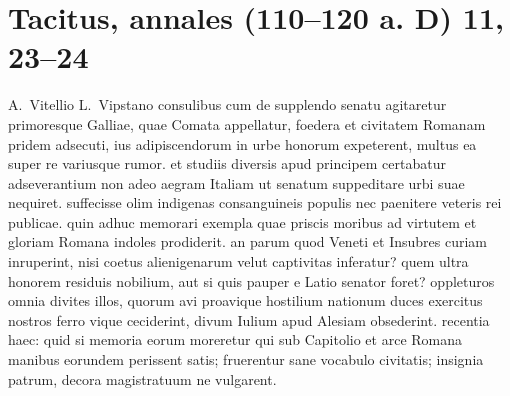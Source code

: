 
\section*{Tacitus, annales (110–120 a. D) 11, 23–24}
\label{sec:annales}

A.~Vitellio L.~Vipstano consulibus cum de supplendo senatu agitaretur primoresque Galliae, quae Comata appellatur, foedera et civitatem Romanam pridem adsecuti, ius adipiscendorum in urbe honorum expeterent, multus ea super re variusque rumor. et studiis diversis apud principem certabatur adseverantium non adeo aegram Italiam ut senatum suppeditare urbi suae nequiret. suffecisse olim indigenas consanguineis populis nec paenitere veteris rei publicae. quin adhuc memorari exempla quae priscis moribus ad virtutem et gloriam Romana indoles prodiderit. an parum quod Veneti et Insubres curiam inruperint, nisi coetus alienigenarum velut captivitas inferatur? quem ultra honorem residuis nobilium, aut si quis pauper e Latio senator foret? oppleturos omnia divites illos, quorum avi proavique hostilium nationum duces exercitus nostros ferro vique ceciderint, divum Iulium apud Alesiam obsederint. recentia haec: quid si memoria eorum moreretur qui sub Capitolio et arce Romana manibus eorundem perissent satis; fruerentur sane vocabulo civitatis; insignia patrum, decora magistratuum ne vulgarent.


